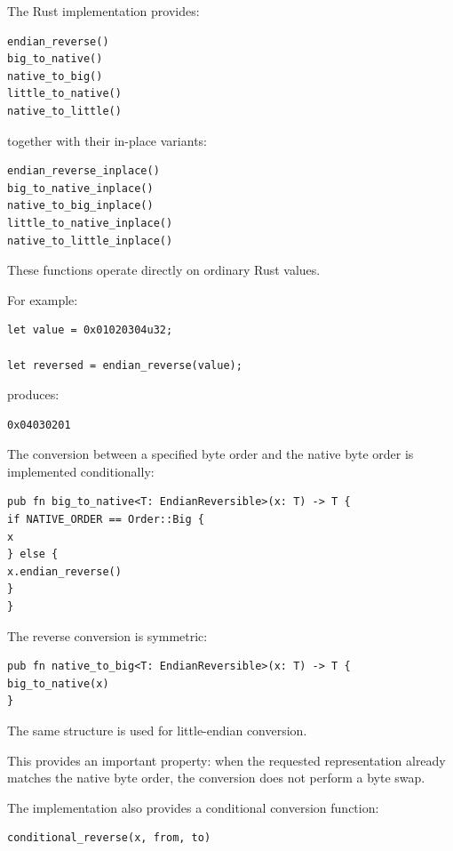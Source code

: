 The Rust implementation provides:

\begin{lstlisting}[style=rustblock]
endian_reverse()
big_to_native()
native_to_big()
little_to_native()
native_to_little()
\end{lstlisting}

together with their in-place variants:

\begin{lstlisting}[style=rustblock]
endian_reverse_inplace()
big_to_native_inplace()
native_to_big_inplace()
little_to_native_inplace()
native_to_little_inplace()
\end{lstlisting}

These functions operate directly on ordinary Rust values.

For example:

\begin{lstlisting}[style=rustblock]
let value = 0x01020304u32;

let reversed = endian_reverse(value);
\end{lstlisting}

produces:

\begin{lstlisting}[style=rustblock]
0x04030201
\end{lstlisting}

The conversion between a specified byte order and the native byte order is implemented conditionally:

\begin{lstlisting}[style=rustblock]
pub fn big_to_native<T: EndianReversible>(x: T) -> T {
if NATIVE_ORDER == Order::Big {
x
} else {
x.endian_reverse()
}
}
\end{lstlisting}

The reverse conversion is symmetric:

\begin{lstlisting}[style=rustblock]
pub fn native_to_big<T: EndianReversible>(x: T) -> T {
big_to_native(x)
}
\end{lstlisting}

The same structure is used for little-endian conversion.

This provides an important property: when the requested representation already matches the native byte order, 
the conversion does not perform a byte swap.

The implementation also provides a conditional conversion function:

\begin{lstlisting}[style=rustblock]
conditional_reverse(x, from, to)
\end{lstlisting}

